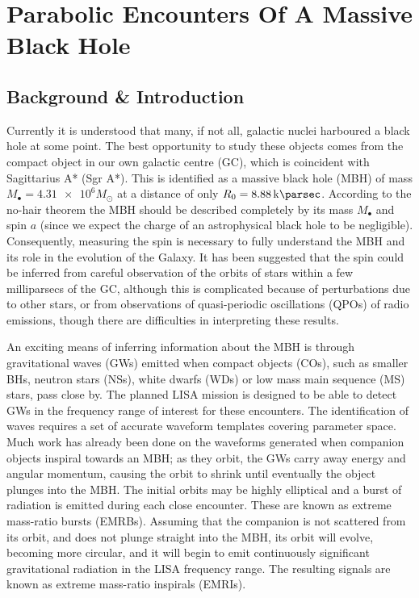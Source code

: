 \chapter{Parabolic Encounters Of A Massive Black Hole}

\section{Background \& Introduction}

Currently it is understood that many, if not all, galactic nuclei harboured a black hole at some point\cite{Lynden-Bell1971, Rees1984}. The best opportunity to study these objects comes from the compact object in our own galactic centre (GC), which is coincident with Sagittarius A* (Sgr A*). This is identified as a massive black hole (MBH) of mass $M_\bullet = \num{4.31e6} M_\odot$ at a distance of only $R_0 = \SI{8.88}{\kilo\parsec}$\cite{Gillessen2009}. According to the no-hair theorem the MBH should be described completely by its mass $M_\bullet$ and spin $a$ (since we expect  the charge of an astrophysical black hole to be negligible)\cite{Israel1967, Israel1968, Carter1971, Hawking1972, Robinson1975, Chandrasekhar1998}. Consequently, measuring the spin is necessary to fully understand the MBH and its role in the evolution of the Galaxy. It has been suggested that the spin could be inferred from careful observation of the orbits of stars within a few milliparsecs of the GC\cite{Merritt2010}, although this is complicated because of perturbations due to other stars, or from observations of quasi-periodic oscillations (QPOs) of radio emissions\cite{Kato2010}, though there are difficulties in interpreting these results\cite{Psaltis2008}.

An exciting means of inferring information about the MBH is through gravitational waves (GWs) emitted when compact objects (COs), such as smaller BHs, neutron stars (NSs), white dwarfs (WDs) or low mass main sequence (MS) stars, pass close by. The planned LISA mission is designed to be able to detect GWs in the frequency range of interest for these encounters\cite{Bender1998, Danzmann2003}. The identification of waves requires a set of accurate waveform templates covering parameter space. Much work has already been done on the waveforms generated when companion objects inspiral towards an MBH; as they orbit, the GWs carry away energy and angular momentum, causing the orbit to shrink until eventually the object plunges into the MBH. The initial orbits may be highly elliptical and a burst of radiation is emitted during each close encounter. These are known as extreme mass-ratio bursts (EMRBs)\cite{Rubbo2006}. Assuming that the companion is not scattered from its orbit, and does not plunge straight into the MBH, its orbit will evolve, becoming more circular, and it will begin to emit continuously significant gravitational radiation in the LISA frequency range. The resulting signals are known as extreme mass-ratio inspirals (EMRIs).

